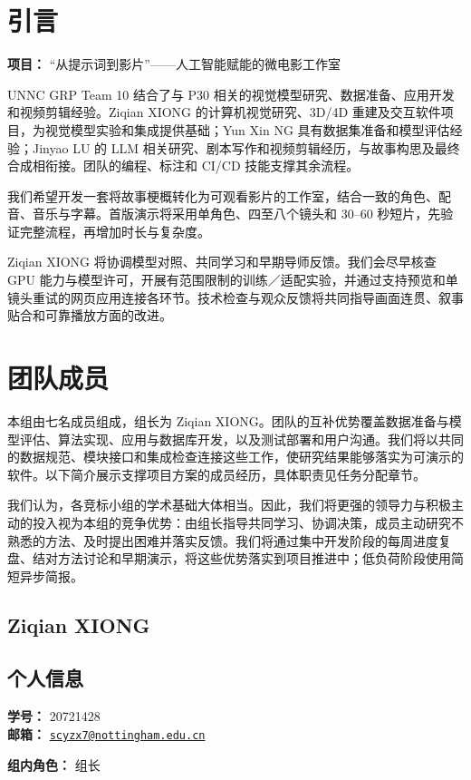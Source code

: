 \documentclass[a4paper,12pt]{article}
\title{\BidTitle}
\author{\BidTeam}
\date{\BidDate}
\newcommand{\PersonalInformation}[2]{%
  \subsection*{个人信息}
  \if\relax\detokenize{#1}\relax\else
  \noindent\textbf{学号：} #1\\
  \fi
  \textbf{邮箱：} #2\par
}
\newcommand{\BidProjectName}{“从提示词到影片”——人工智能赋能的微电影工作室}
\begin{document}
\maketitle
\thispagestyle{plain}
\tableofcontents
\newpage

\section{引言}
\noindent\textbf{项目：} \BidProjectName
\par\medskip
UNNC GRP Team 10 结合了与 P30 相关的视觉模型研究、数据准备、应用开发和视频剪辑经验。Ziqian XIONG 的计算机视觉研究、3D/4D 重建及交互软件项目，为视觉模型实验和集成提供基础；Yun Xin NG 具有数据集准备和模型评估经验；Jinyao LU 的 LLM 相关研究、剧本写作和视频剪辑经历，与故事构思及最终合成相衔接。团队的编程、标注和 CI/CD 技能支撑其余流程。

我们希望开发一套将故事梗概转化为可观看影片的工作室，结合一致的角色、配音、音乐与字幕。首版演示将采用单角色、四至八个镜头和 30--60 秒短片，先验证完整流程，再增加时长与复杂度。

Ziqian XIONG 将协调模型对照、共同学习和早期导师反馈。我们会尽早核查 GPU 能力与模型许可，开展有范围限制的训练／适配实验，并通过支持预览和单镜头重试的网页应用连接各环节。技术检查与观众反馈将共同指导画面连贯、叙事贴合和可靠播放方面的改进。

\newpage
\section{团队成员}
本组由七名成员组成，组长为 Ziqian XIONG。团队的互补优势覆盖数据准备与模型评估、算法实现、应用与数据库开发，以及测试部署和用户沟通。我们将以共同的数据规范、模块接口和集成检查连接这些工作，使研究结果能够落实为可演示的软件。以下简介展示支撑项目方案的成员经历，具体职责见任务分配章节。

我们认为，各竞标小组的学术基础大体相当。因此，我们将更强的领导力与积极主动的投入视为本组的竞争优势：由组长指导共同学习、协调决策，成员主动研究不熟悉的方法、及时提出困难并落实反馈。我们将通过集中开发阶段的每周进度复盘、结对方法讨论和早期演示，将这些优势落实到项目推进中；低负荷阶段使用简短异步简报。

\subsection{Ziqian XIONG}
\PersonalInformation{20721428}{\href{mailto:scyzx7@nottingham.edu.cn}{\nolinkurl{scyzx7@nottingham.edu.cn}}}
\noindent\textbf{组内角色：} 组长\par
\end{document}

